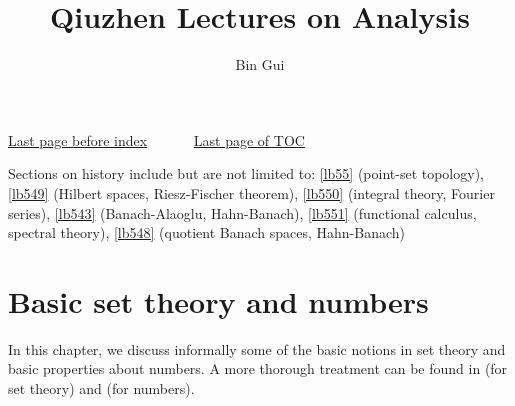 \documentclass[12pt,b5paper,notitlepage]{article}
\title{Qiuzhen Lectures on Analysis}
\author{{\sc Bin Gui}
}
\theoremstyle{definition}
\theoremstyle{plain}
\numberwithin{equation}{section}
\begin{document}
\sloppy %
	\setcounter{page}{1}



	









	
	\maketitle
\small  \hyperlink{beforeindex}{Last page before index}~~~~~~   \hyperlink{page.4}{Last page of TOC}

\noindent Sections on history include but are not limited to: 
\ref{lb55} (point-set topology), \ref{lb549} (Hilbert spaces, Riesz-Fischer theorem), \ref{lb550} (integral theory, Fourier series), \ref{lb543} (Banach-Alaoglu, Hahn-Banach), \ref{lb551} (functional calculus, spectral theory), \ref{lb548} (quotient Banach spaces, Hahn-Banach)
\normalsize



\makeatletter
\newcommand*{\toccontents}{}
\makeatother
\toccontents

\hypertarget{endoftoc}{}

	


\newpage

\section{Basic set theory and numbers}


In this chapter, we discuss informally some of the basic notions in set theory and basic properties about numbers. A more thorough treatment can be found in \cite[Ch. 1]{Mun} (for set theory) and \cite[Ch. 1]{Rud-P} (for numbers). 
\end{document}
